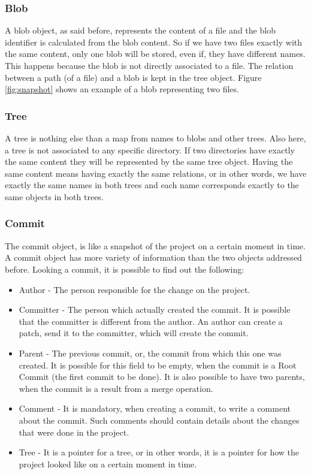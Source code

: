 \subsubsection{Blob}
A blob object, as said before, represents the content of a
file and the blob identifier is calculated from the blob content. So if we
have two files exactly with the same content, only one blob will be
stored, even if, they have different names. This happens because the
blob is not directly associated to a file. The relation between a path
(of a file) and a blob is kept in the tree object.  Figure \ref{fig:snapshot} 
shows an example of a blob representing two files.

\subsubsection{Tree}
A tree is nothing else than a map from names to blobs and other trees. Also here, a tree is not associated to any 
specific directory. If two directories have exactly the same content they will be
represented by the same tree object. Having the same content means
having exactly the same relations, or in other words, we
have exactly the same names in both trees and each name corresponds exactly
to the same objects in both trees. 

\subsubsection{Commit}
The commit object, is like a snapshot of the project on a certain moment in
time. A commit object has more variety of information than the two
objects addressed before. Looking a commit, it is possible to find out
the following:
\begin{itemize}
   \item Author - The person responsible for the change on the
   project.
   \item Committer - The person which actually created the commit. It
   is possible that the committer is different from the author. An
   author can create a patch, send it to the committer,
   which will create the commit.
   \item Parent - The previous commit, or, the commit from which this
   one was created. It is possible for this field to be empty, when 
   the commit is a Root Commit (the first commit to be done). 
   It is also possible to have two parents, when the commit is a result
   from a merge operation.
   \item Comment - It is mandatory, when creating a commit, to write a
   comment about the commit. Such comments should contain details about
   the changes that were done in the project.
   \item Tree - It is a pointer for a tree, or in other words, it is a pointer
   for how the project looked like on a certain moment in time. 
\end{itemize}

